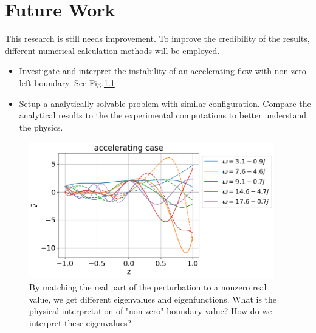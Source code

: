 \chapter{Future Work}
This research is still needs improvement. To improve the credibility of the results, different numerical calculation methods will be employed.

\begin{itemize}
  \item Investigate and interpret the instability of an accelerating flow with non-zero left boundary. See Fig.\ref{fig:accelerating-v-nonzero-bc}
  \item Setup a analytically solvable problem with similar configuration. Compare the analytical results to the the experimental computations to better understand the physics.
\end{itemize}

\begin{figure}[htbp]
  \centering
  \includegraphics[width=0.95\textwidth]{../../thesis/img/numerical-experiments/accelerating-v-nonzero-bc}
  \caption{By matching the real part of the perturbation to a nonzero real value, we get different eigenvalues and eigenfunctions. What is the physical interpretation of "non-zero" boundary value? How do we interpret these eigenvalues?}
  \label{fig:accelerating-v-nonzero-bc}
\end{figure}

